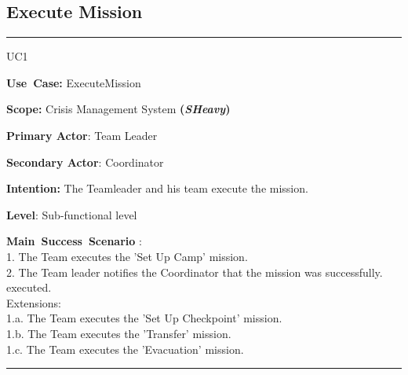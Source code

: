 \subsection{Execute Mission}
\vspace{0.5cm}
\hrule
\vspace{0.5cm}
\begin{lyxlist}{UC1}
\small{
\item [\textbf{Use~Case:}] ExecuteMission
\item [\textbf{Scope:}] Crisis Management System \textbf{(\emph{SHeavy})}
\item [\textbf{Primary Actor}:] Team Leader
\item [\textbf{Secondary Actor}:] Coordinator
\item [\textbf{Intention:}]The Teamleader and his team execute the mission.
\item [\textbf{Level}:]Sub-functional level
\item [\textbf{Main~Success~Scenario}]:\\
1. The Team  executes the 'Set Up Camp' mission.\\
2. The Team leader notifies the Coordinator that the mission was successfully.
executed.\\
 Extensions:\\
	1.a. The Team  executes the 'Set Up Checkpoint' mission.\\
	1.b. The Team  executes the 'Transfer' mission.\\
	1.c. The Team  executes the 'Evacuation' mission.\\
}
\end{lyxlist}
\hrule 
\vspace{0.5cm} 

